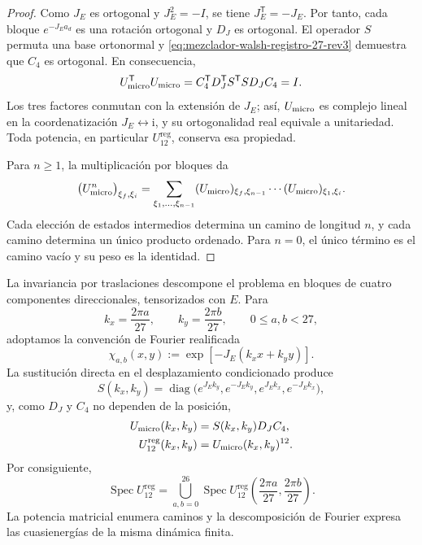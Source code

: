 \begin{proof}
Como \(J_E\) es ortogonal y \(J_E^2=-I\), se tiene
\(J_E^{\mathsf T}=-J_E\). Por tanto, cada bloque
\(e^{-J_Ea_d}\) es una rotación ortogonal y \(D_J\) es ortogonal.
El operador \(S\) permuta una base ortonormal y
\eqref{eq:mezclador-walsh-registro-27-rev3} demuestra que \(C_4\) es
ortogonal. En consecuencia,
\[
 U_{\rm micro}^{\mathsf T}U_{\rm micro}
 =C_4^{\mathsf T}D_J^{\mathsf T}S^{\mathsf T}
   S D_JC_4
 =I.
\]
Los tres factores conmutan con la extensión de \(J_E\); así,
\(U_{\rm micro}\) es complejo lineal en la coordenatización
\(J_E\leftrightarrow\mathrm i\), y su ortogonalidad real equivale a
unitariedad. Toda potencia, en particular
\(U_{12}^{\mathrm{reg}}\), conserva esa propiedad.

Para \(n\geq1\), la multiplicación por bloques da
\[
 \bigl(U_{\rm micro}^{n}\bigr)_{\xi_f,\xi_i}
 =
 \sum_{\xi_1,\ldots,\xi_{n-1}}
 (U_{\rm micro})_{\xi_f,\xi_{n-1}}
 \cdots
 (U_{\rm micro})_{\xi_1,\xi_i}.
\]
Cada elección de estados intermedios determina un camino de longitud \(n\),
y cada camino determina un único producto ordenado. Para \(n=0\), el único
término es el camino vacío y su peso es la identidad.
\end{proof}

La invariancia por traslaciones descompone el problema en bloques de cuatro
componentes direccionales, tensorizados con \(E\). Para
\[
 k_x=\frac{2\pi a}{27},
 \qquad
 k_y=\frac{2\pi b}{27},
 \qquad 0\leq a,b<27,
\]
adoptamos la convención de Fourier realificada
\[
 \chi_{a,b}(x,y)
 :=\exp[-J_E(k_xx+k_yy)].
\]
La sustitución directa en el desplazamiento condicionado produce
\[
 S(k_x,k_y)
 =\operatorname{diag}
 \bigl(
  e^{J_Ek_y},e^{-J_Ek_y},
  e^{J_Ek_x},e^{-J_Ek_x}
 \bigr),
\]
y, como \(D_J\) y \(C_4\) no dependen de la posición,
\begin{equation}
 \begin{aligned}
 U_{\rm micro}(k_x,k_y)
   &=S(k_x,k_y)D_JC_4,\\
 U_{12}^{\mathrm{reg}}(k_x,k_y)
   &=U_{\rm micro}(k_x,k_y)^{12}.
 \end{aligned}
 \label{eq:bloques-fourier-registro-27-rev3}
\end{equation}
Por consiguiente,
\[
 \operatorname{Spec}U_{12}^{\mathrm{reg}}
 =
 \bigcup_{a,b=0}^{26}
 \operatorname{Spec}
 U_{12}^{\mathrm{reg}}
 \left(\frac{2\pi a}{27},\frac{2\pi b}{27}\right).
\]
La potencia matricial enumera caminos y la descomposición de Fourier expresa
las cuasienergías de la misma dinámica finita.

